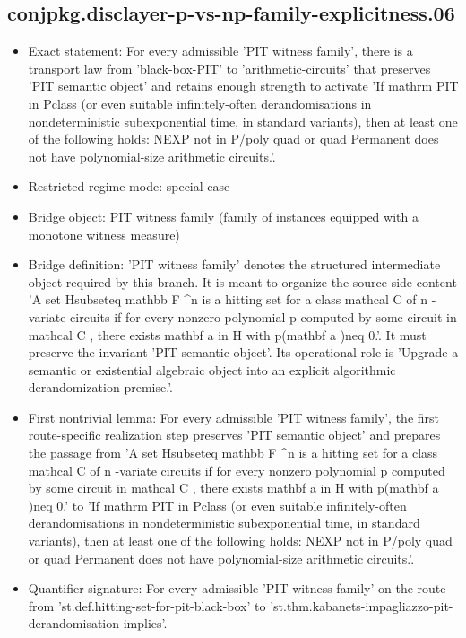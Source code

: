 \documentclass[11pt]{article}
\begin{document}
\subsection*{conjpkg.disclayer-p-vs-np-family-explicitness.06}
\begin{itemize}
\item Exact statement: For every admissible 'PIT witness family', there is a transport law from 'black-box-PIT' to 'arithmetic-circuits' that preserves 'PIT semantic object' and retains enough strength to activate 'If mathrm PIT in Pclass (or even suitable infinitely-often derandomisations in nondeterministic subexponential time, in standard variants), then at least one of the following holds: NEXP not in P/poly quad or quad Permanent does not have polynomial-size arithmetic circuits.'.
\item Restricted-regime mode: special-case
\item Bridge object: PIT witness family (family of instances equipped with a monotone witness measure)
\item Bridge definition: 'PIT witness family' denotes the structured intermediate object required by this branch. It is meant to organize the source-side content 'A set Hsubseteq mathbb F \textasciicircum{}n is a hitting set for a class mathcal C of n -variate circuits if for every nonzero polynomial p computed by some circuit in mathcal C , there exists mathbf a in H with p(mathbf a )neq 0.'. It must preserve the invariant 'PIT semantic object'. Its operational role is 'Upgrade a semantic or existential algebraic object into an explicit algorithmic derandomization premise.'.
\item First nontrivial lemma: For every admissible 'PIT witness family', the first route-specific realization step preserves 'PIT semantic object' and prepares the passage from 'A set Hsubseteq mathbb F \textasciicircum{}n is a hitting set for a class mathcal C of n -variate circuits if for every nonzero polynomial p computed by some circuit in mathcal C , there exists mathbf a in H with p(mathbf a )neq 0.' to 'If mathrm PIT in Pclass (or even suitable infinitely-often derandomisations in nondeterministic subexponential time, in standard variants), then at least one of the following holds: NEXP not in P/poly quad or quad Permanent does not have polynomial-size arithmetic circuits.'.
\item Quantifier signature: For every admissible 'PIT witness family' on the route from 'st.def.hitting-set-for-pit-black-box' to 'st.thm.kabanets-impagliazzo-pit-derandomisation-implies'.

\end{itemize}
\end{document}
